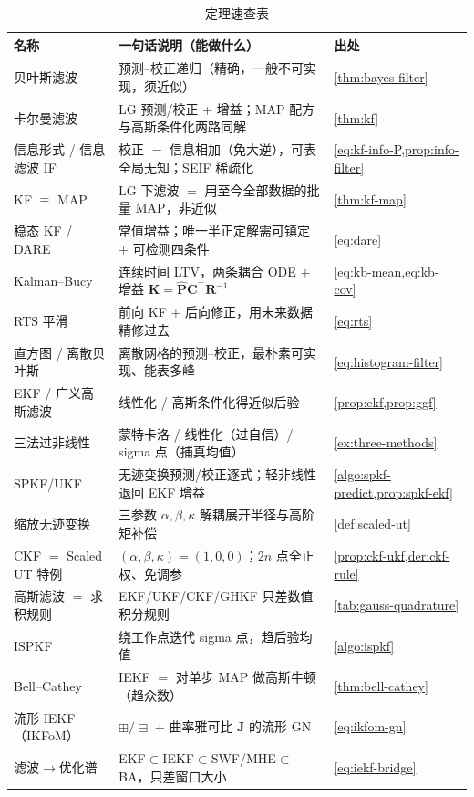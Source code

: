\begin{table}[H]\centering\small
\caption{定理速查表}
\begin{tabular}{lll}
\toprule
名称 & 一句话说明（能做什么） & 出处 \\
\midrule
贝叶斯滤波 & 预测–校正递归（精确，一般不可实现，须近似） & \cref{thm:bayes-filter} \\
卡尔曼滤波 & LG 预测/校正 + 增益；MAP 配方与高斯条件化两路同解 & \cref{thm:kf} \\
信息形式 / 信息滤波 IF & 校正 $=$ 信息相加（免大逆），可表全局无知；SEIF 稀疏化 & \cref{eq:kf-info-P,prop:info-filter} \\
KF $\equiv$ MAP & LG 下滤波 $=$ 用至今全部数据的批量 MAP，非近似 & \cref{thm:kf-map} \\
稳态 KF / DARE & 常值增益；唯一半正定解需可镇定 $+$ 可检测四条件 & \cref{eq:dare} \\
Kalman--Bucy & 连续时间 LTV，两条耦合 ODE $+$ 增益 $\mathbf{K}=\hat{\mathbf{P}}\mathbf{C}^\top\mathbf{R}^{-1}$ & \cref{eq:kb-mean,eq:kb-cov} \\
RTS 平滑 & 前向 KF $+$ 后向修正，用未来数据精修过去 & \cref{eq:rts} \\
直方图 / 离散贝叶斯 & 离散网格的预测–校正，最朴素可实现、能表多峰 & \cref{eq:histogram-filter} \\
EKF / 广义高斯滤波 & 线性化 / 高斯条件化得近似后验 & \cref{prop:ekf,prop:ggf} \\
三法过非线性 & 蒙特卡洛 / 线性化（过自信）/ sigma 点（捕真均值） & \cref{ex:three-methods} \\
SPKF/UKF & 无迹变换预测/校正逐式；轻非线性退回 EKF 增益 & \cref{algo:spkf-predict,prop:spkf-ekf} \\
缩放无迹变换 & 三参数 $\alpha,\beta,\kappa$ 解耦展开半径与高阶矩补偿 & \cref{def:scaled-ut} \\
CKF $=$ Scaled UT 特例 & $(\alpha,\beta,\kappa)=(1,0,0)$；$2n$ 点全正权、免调参 & \cref{prop:ckf-ukf,der:ckf-rule} \\
高斯滤波 $=$ 求积规则 & EKF/UKF/CKF/GHKF 只差数值积分规则 & \cref{tab:gauss-quadrature} \\
ISPKF & 绕工作点迭代 sigma 点，趋后验均值 & \cref{algo:ispkf} \\
Bell--Cathey & IEKF $=$ 对单步 MAP 做高斯牛顿（趋众数） & \cref{thm:bell-cathey} \\
流形 IEKF（IKFoM） & $\boxplus/\boxminus$ $+$ 曲率雅可比 $\mathbf{J}$ 的流形 GN & \cref{eq:ikfom-gn} \\
滤波$\to$优化谱 & EKF$\subset$IEKF$\subset$SWF/MHE$\subset$BA，只差窗口大小 & \cref{eq:iekf-bridge} \\

\end{tabular}
\end{table}
